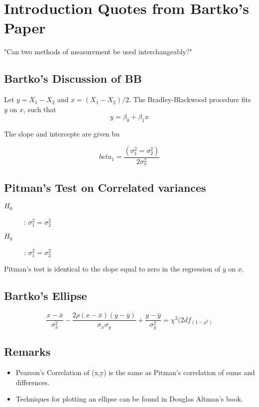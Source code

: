 \documentclass[MASTER.tex]{subfiles}
\begin{document}
\section*{Introduction Quotes from Bartko's Paper}
"Can two methods of measurement be used interchangeably?"


\subsection*{Bartko's Discussion of BB}

Let $y = X_1 - X_2$ and $x= (X_1 - X_2)/2$.
The Bradley-Blackwood procedure fits $y$ on $x$, such that
\[ y = \beta_0 + \beta_1x \]

The slope and intercepte are given bu

\[beta_1 =  \frac{(\sigma^2_1 = \sigma^2_2)}{2\sigma^2_x}\]
\subsection*{Pitman's Test on Correlated variances}
\begin{description}
\item[$H_0$] : $\sigma^2_1 = \sigma^2_2$
\item[$H_0$] : $\sigma^2_1 = \sigma^2_2$
\end{description}


Pitman's test is identical to the slope equal to zero in the regression of $y$ on $x$.


\subsection*{Bartko's Ellipse}

\[ \frac{x - \bar{x}}{\sigma^2_x} - \frac{2\rho(x - \bar{x})(y - \bar{y})}{\sigma_x \sigma_y} + \frac{y - \bar{y}}{\sigma^2_y} = \chi^2(2df_(1-\rho^2) \]

\subsection*{Remarks}
\begin{itemize}
\item Pearson's Correlation of (x,y) is the same as Pitman's correlation of sums and differences.

\item Techniques for plotting an ellipse can be found in Douglas Altman's book.
\end{itemize}
\newpage
\end{document}
